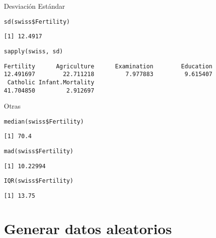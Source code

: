 \documentclass[xcolor={usenames,svgnames,dvipsnames}]{beamer}
\begin{document}
\begin{frame}[fragile,label={sec:org3a946f9}]{Desviación Estándar}
 \lstset{language=r,label= ,caption= ,captionpos=b,numbers=none}
\begin{lstlisting}
sd(swiss$Fertility)
\end{lstlisting}

\begin{verbatim}
[1] 12.4917
\end{verbatim}

\lstset{language=r,label= ,caption= ,captionpos=b,numbers=none}
\begin{lstlisting}
sapply(swiss, sd)
\end{lstlisting}

\begin{verbatim}
Fertility      Agriculture      Examination        Education 
12.491697        22.711218         7.977883         9.615407 
 Catholic Infant.Mortality 
41.704850         2.912697
\end{verbatim}
\end{frame}

\begin{frame}[fragile,label={sec:orgdcd26a0}]{Otras}
 \lstset{language=r,label= ,caption= ,captionpos=b,numbers=none}
\begin{lstlisting}
median(swiss$Fertility)
\end{lstlisting}

\begin{verbatim}
[1] 70.4
\end{verbatim}

\lstset{language=r,label= ,caption= ,captionpos=b,numbers=none}
\begin{lstlisting}
mad(swiss$Fertility)
\end{lstlisting}

\begin{verbatim}
[1] 10.22994
\end{verbatim}

\lstset{language=r,label= ,caption= ,captionpos=b,numbers=none}
\begin{lstlisting}
IQR(swiss$Fertility)
\end{lstlisting}

\begin{verbatim}
[1] 13.75
\end{verbatim}
\end{frame}

\section{Generar datos aleatorios}
\label{sec:orge5a453b}
\end{document}
